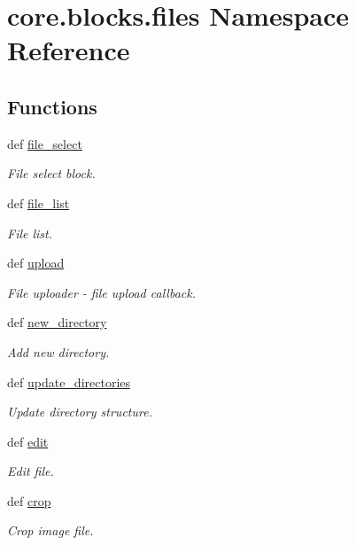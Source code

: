 \hypertarget{namespacecore_1_1blocks_1_1files}{\section{core.\-blocks.\-files Namespace Reference}
\label{namespacecore_1_1blocks_1_1files}
}
\subsection*{Functions}
\begin{DoxyCompactItemize}
\item 
def \hyperlink{namespacecore_1_1blocks_1_1files_a9829084d79eb53648aa97b8c2973cc20}{file\-\_\-select}
\begin{DoxyCompactList}\small\item\em File select block. \end{DoxyCompactList}\item 
def \hyperlink{namespacecore_1_1blocks_1_1files_aa27334074f2a267540aa1630161edb60}{file\-\_\-list}
\begin{DoxyCompactList}\small\item\em File list. \end{DoxyCompactList}\item 
def \hyperlink{namespacecore_1_1blocks_1_1files_a8bef5d30211f790c561e88d0183cee6d}{upload}
\begin{DoxyCompactList}\small\item\em File uploader -\/ file upload callback. \end{DoxyCompactList}\item 
def \hyperlink{namespacecore_1_1blocks_1_1files_ae64111782e18e6e9cefd5d9227c427ec}{new\-\_\-directory}
\begin{DoxyCompactList}\small\item\em Add new directory. \end{DoxyCompactList}\item 
def \hyperlink{namespacecore_1_1blocks_1_1files_aeded40d3375f5a4726d3a00a4b84f6fd}{update\-\_\-directories}
\begin{DoxyCompactList}\small\item\em Update directory structure. \end{DoxyCompactList}\item 
def \hyperlink{namespacecore_1_1blocks_1_1files_ac1efc1a2b3350b9ba65d8fb58a797544}{edit}
\begin{DoxyCompactList}\small\item\em Edit file. \end{DoxyCompactList}\item 
def \hyperlink{namespacecore_1_1blocks_1_1files_a2c2a17d7476634447201665510b05b07}{crop}
\begin{DoxyCompactList}\small\item\em Crop image file. \end{DoxyCompactList}\end{DoxyCompactItemize}


